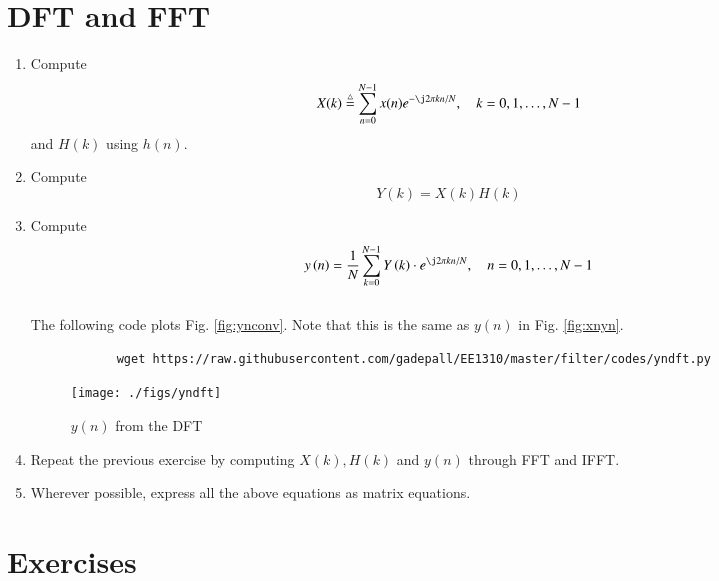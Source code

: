 \documentclass[journal,12pt,twocolumn]{IEEEtran}
\renewcommand\thesection{\arabic{section}}
\begin{document}
	\section{DFT and FFT}
	\begin{enumerate}[label=\thesection.\arabic*]
		\item
		Compute
		\begin{equation}
			X(k) \define \sum _{n=0}^{N-1}x(n) e^{-\j2\pi kn/N}, \quad k = 0,1,\dots, N-1
		\end{equation}
		and $H(k)$ using $h(n)$.
		\item Compute 
		\begin{equation}
			Y(k) = X(k)H(k)
		\end{equation}
		\item Compute
		\begin{equation}
			y\brak{n}={\frac {1}{N}}\sum _{k=0}^{N-1}Y\brak{k}\cdot e^{\j 2\pi kn/N},\quad n = 0,1,\dots, N-1
		\end{equation}
		\\
		\solution The following code plots Fig. \ref{fig:ynconv}. Note that this is the same as 
		$y(n)$ in  Fig. 
		\ref{fig:xnyn}. 
		\begin{lstlisting}
			wget https://raw.githubusercontent.com/gadepall/EE1310/master/filter/codes/yndft.py
		\end{lstlisting}
		\begin{figure}[!ht]
			\centering
			\texttt{[image: ./figs/yndft]}
			\caption{$y(n)$ from the DFT}
			\label{fig:yndft}
		\end{figure}
		
		\item Repeat the previous exercise by computing $X(k), H(k)$ and $y(n)$ through FFT and 
		IFFT.
		\item Wherever possible, express all the above equations as matrix equations.
	\end{enumerate}
	\section{Exercises}
	
\end{document}
